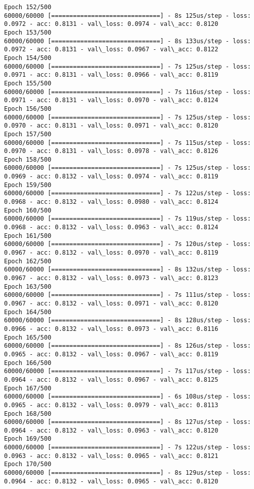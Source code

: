 \documentclass[11pt]{article}
\begin{document}
\begin{Verbatim}[commandchars=\\\{\}]
Epoch 152/500
60000/60000 [==============================] - 8s 125us/step - loss: 0.0972 - acc: 0.8131 - val\_loss: 0.0974 - val\_acc: 0.8120
Epoch 153/500
60000/60000 [==============================] - 8s 133us/step - loss: 0.0972 - acc: 0.8131 - val\_loss: 0.0967 - val\_acc: 0.8122
Epoch 154/500
60000/60000 [==============================] - 7s 125us/step - loss: 0.0971 - acc: 0.8131 - val\_loss: 0.0966 - val\_acc: 0.8119
Epoch 155/500
60000/60000 [==============================] - 7s 116us/step - loss: 0.0971 - acc: 0.8131 - val\_loss: 0.0970 - val\_acc: 0.8124
Epoch 156/500
60000/60000 [==============================] - 7s 125us/step - loss: 0.0970 - acc: 0.8131 - val\_loss: 0.0971 - val\_acc: 0.8120
Epoch 157/500
60000/60000 [==============================] - 7s 115us/step - loss: 0.0970 - acc: 0.8131 - val\_loss: 0.0978 - val\_acc: 0.8126
Epoch 158/500
60000/60000 [==============================] - 7s 125us/step - loss: 0.0969 - acc: 0.8132 - val\_loss: 0.0974 - val\_acc: 0.8119
Epoch 159/500
60000/60000 [==============================] - 7s 122us/step - loss: 0.0968 - acc: 0.8132 - val\_loss: 0.0980 - val\_acc: 0.8124
Epoch 160/500
60000/60000 [==============================] - 7s 119us/step - loss: 0.0968 - acc: 0.8132 - val\_loss: 0.0963 - val\_acc: 0.8124
Epoch 161/500
60000/60000 [==============================] - 7s 120us/step - loss: 0.0967 - acc: 0.8132 - val\_loss: 0.0970 - val\_acc: 0.8119
Epoch 162/500
60000/60000 [==============================] - 8s 132us/step - loss: 0.0967 - acc: 0.8132 - val\_loss: 0.0973 - val\_acc: 0.8123
Epoch 163/500
60000/60000 [==============================] - 7s 111us/step - loss: 0.0967 - acc: 0.8132 - val\_loss: 0.0971 - val\_acc: 0.8120
Epoch 164/500
60000/60000 [==============================] - 8s 128us/step - loss: 0.0966 - acc: 0.8132 - val\_loss: 0.0973 - val\_acc: 0.8116
Epoch 165/500
60000/60000 [==============================] - 8s 126us/step - loss: 0.0965 - acc: 0.8132 - val\_loss: 0.0967 - val\_acc: 0.8119
Epoch 166/500
60000/60000 [==============================] - 7s 117us/step - loss: 0.0964 - acc: 0.8132 - val\_loss: 0.0967 - val\_acc: 0.8125
Epoch 167/500
60000/60000 [==============================] - 6s 108us/step - loss: 0.0965 - acc: 0.8132 - val\_loss: 0.0979 - val\_acc: 0.8113
Epoch 168/500
60000/60000 [==============================] - 8s 127us/step - loss: 0.0964 - acc: 0.8132 - val\_loss: 0.0963 - val\_acc: 0.8120
Epoch 169/500
60000/60000 [==============================] - 7s 122us/step - loss: 0.0963 - acc: 0.8132 - val\_loss: 0.0965 - val\_acc: 0.8121
Epoch 170/500
60000/60000 [==============================] - 8s 129us/step - loss: 0.0964 - acc: 0.8132 - val\_loss: 0.0965 - val\_acc: 0.8120

\end{Verbatim}
\end{document}
